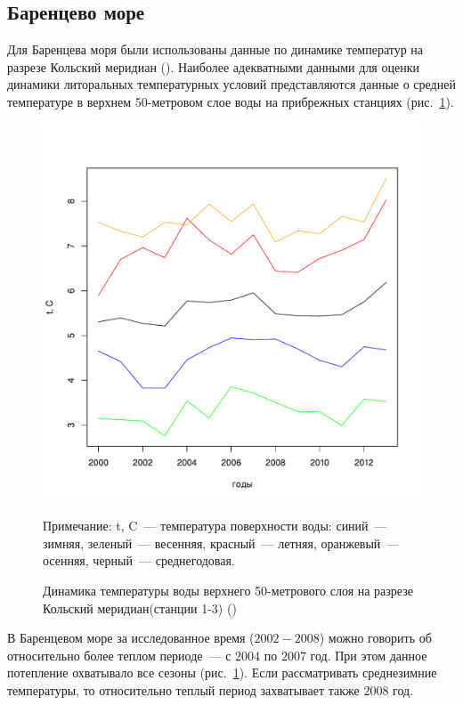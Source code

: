 		\subsection{Баренцево море}
Для Баренцева моря были использованы данные по динамике температур на разрезе Кольский меридиан (\cite{pinro}). 
Наиболее адекватными данными для оценки динамики литоральных температурных условий представляются данные о средней температуре в верхнем 50-метровом слое воды на прибрежных станциях (рис.~\ref{ris:Barents_temp_dynamic}).
	\begin{figure}[p]
    \includegraphics[width=\textwidth]{../Barenc_Sea/temperature/t_air_mean_season_year1.pdf}
    \caption{Динамика температуры воды верхнего 50-метрового слоя на разрезе Кольский меридиан(станции 1-3) (\cite{pinro})}

{\footnotesize Примечание: t, C~--- температура поверхности воды: синий~--- зимняя, зеленый~--- весенняя, красный~--- летняя, оранжевый~--- осенняя, черный~--- среднегодовая. }
    \label{ris:Barents_temp_dynamic}
	\end{figure}

В Баренцевом море за исследованное время ($2002 - 2008$) можно говорить об относительно более теплом периоде~--- с $2004$ по $2007$ год.
При этом данное потепление охватывало все сезоны (рис.~\ref{ris:Barents_temp_dynamic}).
Если рассматривать среднезимние температуры, то относительно теплый период захватывает также $2008$ год.


